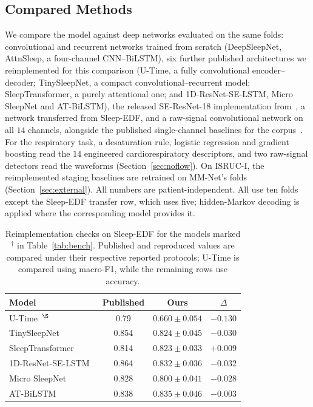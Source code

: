 \documentclass{ieeeaccess}
\begin{document}
\subsection{Compared Methods}
We compare the model against deep networks evaluated on the same folds: convolutional and
recurrent networks trained from scratch (DeepSleepNet, AttnSleep, a four-channel CNN--BiLSTM),
six further published architectures we reimplemented for this comparison (U-Time, a
fully convolutional encoder--decoder; TinySleepNet, a compact convolutional--recurrent model;
SleepTransformer, a purely attentional one; and 1D-ResNet-SE-LSTM, Micro SleepNet and
AT-BiLSTM), the released SE-ResNet-18 implementation from~\cite{bose2026gap}, a
network transferred from Sleep-EDF, and a raw-signal convolutional network on all $14$ channels,
alongside the published single-channel baselines for the corpus~\cite{maiti2026isleeps}. For the
respiratory task, a desaturation rule, logistic regression and gradient boosting read the $14$
engineered cardiorespiratory descriptors, and two raw-signal detectors read the waveforms
(Section~\ref{sec:noflow}). On ISRUC-I, the reimplemented staging baselines are retrained on
MM-Net's folds (Section~\ref{sec:external}). All numbers are
patient-independent. All use ten folds except the Sleep-EDF transfer row, which uses five; hidden-Markov decoding is applied where the corresponding model provides it.

\begin{table}[t]
\caption{Reimplementation checks on Sleep-EDF for the models marked $^{\dagger}$ in Table~\ref{tab:bench}. Published and reproduced values are compared under their respective reported protocols; U-Time is compared using macro-F1, while the remaining rows use accuracy.}
\label{tab:reimpl}
\centering
\begin{tabular}{@{}l c c c@{}}
\toprule
Model & Published & Ours & $\Delta$ \\
\midrule
U-Time~\cite{perslev2019utime}$^{\S}$ & 0.79 & $0.660 \pm 0.054$ & $-0.130$ \\
TinySleepNet~\cite{supratak2020tinysleepnet} & 0.854 & $0.824 \pm 0.045$ & $-0.030$ \\
SleepTransformer~\cite{sleeptransformer2022} & 0.814 & $0.823 \pm 0.033$ & $+0.009$ \\
1D-ResNet-SE-LSTM~\cite{li2023resnetselstm} & 0.864 & $0.832 \pm 0.036$ & $-0.032$ \\
Micro SleepNet~\cite{liu2023microsleepnet} & 0.828 & $0.800 \pm 0.041$ & $-0.028$ \\
AT-BiLSTM~\cite{fu2021atbilstm} & 0.838 & $0.835 \pm 0.046$ & $-0.003$ \\
\bottomrule
\end{tabular}
\end{table}
\end{document}
